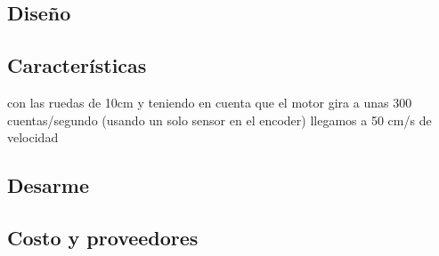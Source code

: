 \subsection{Dise\~no}
\label{h_prototipo_diseno}

\subsection{Caracter\'isticas}
\label{h_prototipo_caracteristicas}

con las ruedas de 10cm y teniendo en cuenta que el motor gira a unas 300 cuentas/segundo (usando un solo sensor en el encoder) llegamos a 50 cm/s de velocidad

\subsection{Desarme}
\label{h_prototipo_desarme}

\subsection{Costo y proveedores}
\label{h_prototipo_costo}
